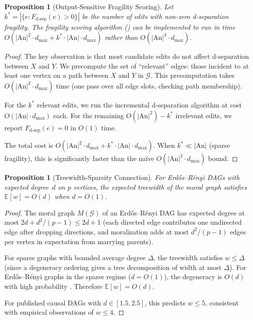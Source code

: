 \documentclass[11pt,a4paper]{article}
\newtheorem{proposition}[theorem]{Proposition}
\theoremstyle{definition}
\theoremstyle{remark}
\newcommand{\DAG}{\mathcal{G}}
\newcommand{\An}{\mathrm{An}}
\newcommand{\dsep}{\mathrm{d\text{-}sep}}
\newcommand{\fragility}{F}
\newcommand{\E}{\mathbb{E}}
\begin{document}
\begin{proposition}[Output-Sensitive Fragility Scoring]\label{prop:output_sensitive}
Let $k^* = |\{e : \fragility_{\dsep}(e) > 0\}|$ be the number of edits with non-zero
d-separation fragility. The fragility scoring algorithm () can be
implemented to run in time $O(|\An|^2 \cdot d_{\max} + k^* \cdot |\An| \cdot d_{\max})$
rather than $O(|\An|^3 \cdot d_{\max})$.
\end{proposition}

\begin{proof}
The key observation is that most candidate edits do not affect d-separation between $X$
and $Y$. We precompute the set of ``relevant'' edges: those incident to at least one
vertex on a path between $X$ and $Y$ in $\DAG$. This precomputation takes
$O(|\An|^2 \cdot d_{\max})$ time (one pass over all edge slots, checking path membership).

For the $k^*$ relevant edits, we run the incremental d-separation algorithm at cost
$O(|\An| \cdot d_{\max})$ each. For the remaining $O(|\An|^2) - k^*$ irrelevant edits,
we report $\fragility_{\dsep}(e) = 0$ in $O(1)$ time.

The total cost is $O(|\An|^2 \cdot d_{\max} + k^* \cdot |\An| \cdot d_{\max})$. When
$k^* \ll |\An|$ (sparse fragility), this is significantly faster than the na\"ive
$O(|\An|^3 \cdot d_{\max})$ bound.
\end{proof}

\begin{proposition}[Treewidth-Sparsity Connection]\label{prop:tw_sparsity}
For Erd\H{o}s--R\'enyi DAGs with expected degree~$d$ on $p$ vertices, the expected
treewidth of the moral graph satisfies $\E[w] = O(d)$ when $d = O(1)$.
\end{proposition}

\begin{proof}
The moral graph $M(\DAG)$ of an Erd\H{o}s--R\'enyi DAG has expected degree at most
$2d + d^2/(p-1) \leq 2d + 1$ (each directed edge contributes one undirected edge after
dropping directions, and moralization adds at most $d^2/(p-1)$ edges per vertex in
expectation from marrying parents).

For sparse graphs with bounded average degree $\Delta$, the treewidth satisfies
$w \leq \Delta$ (since a degeneracy ordering gives a tree decomposition of width at
most $\Delta$). For Erd\H{o}s--R\'enyi graphs in the sparse regime ($d = O(1)$), the
degeneracy is $O(d)$ with high probability \cite{pittel2001}. Therefore
$\E[w] = O(d)$.

For published causal DAGs with $d \in [1.5, 2.5]$, this predicts $w \leq 5$, consistent
with empirical observations of $w \leq 4$.
\end{proof}
\end{document}

